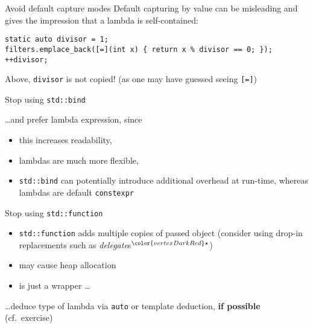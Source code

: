 \begin{frame}[fragile]{Avoid default capture modes}
    Default capturing by value can be misleading and gives the impression that a lambda is self-contained:
    \begin{lstlisting}
static auto divisor = 1;
filters.emplace_back([=](int x) { return x % divisor == 0; });
++divisor;
    \end{lstlisting}
    Above, \texttt{divisor} is not copied! (as one may have guessed seeing \texttt{[=]})
\end{frame}

\begin{frame}[fragile]{Stop using \texttt{std::bind}}

    \ldots and prefer lambda expression, since
    \begin{itemize}
        \item this increases readability,
        \item lambdas are much more flexible,
        \item \texttt{std::bind} can potentially introduce additional overhead at run-time, whereas lambdas are default \texttt{constexpr}
    \end{itemize}
\end{frame}

\begin{frame}[fragile]{Stop using \texttt{std::function}}

    \begin{itemize}
        \item \texttt{std::function} adds multiple copies of passed object (consider using drop-in replacements such as \textit{delegate}s${}^{\color{vertexDarkRed}\star}$)
        \item may cause heap allocation
        \item is just a wrapper \ldots
    \end{itemize}
    \ldots deduce type of lambda via \texttt{auto} or template deduction, \textbf{if possible} (cf.\ exercise)

    \vspace{5mm}

\end{frame}

